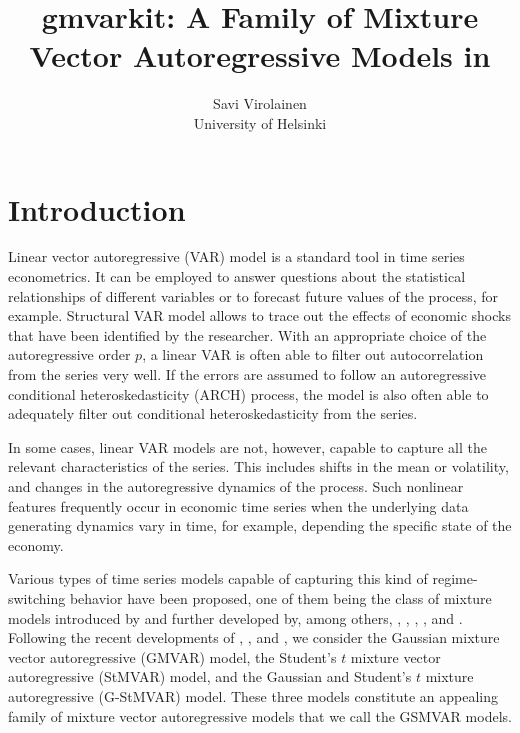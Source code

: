 \documentclass[nojss]{jss}
\author{Savi Virolainen\\ University of Helsinki}
\title{gmvarkit: A Family of Mixture Vector Autoregressive Models in \proglang{R}}
\makeatletter
\def\tableofcontents{%
  \section*{\contentsname}%
  \@starttoc{toc}%
}
\makeatother
\begin{document}
\pagebreak
\tableofcontents
\vfill
\pagebreak
{}

\section{Introduction}


Linear vector autoregressive (VAR) model is a standard tool in time series econometrics. It can be employed to answer questions about the statistical relationships of different variables or to forecast future values of the process, for example. Structural VAR model allows to trace out the effects of economic shocks that have been identified by the researcher. With an appropriate choice of the autoregressive order $p$, a linear VAR is often able to filter out autocorrelation from the series very well. If the errors are assumed to follow an autoregressive conditional heteroskedasticity (ARCH) process, the model is also often able to adequately filter out conditional heteroskedasticity from the series.

In some cases, linear VAR models are not, however, capable to capture all the relevant characteristics of the series. This includes shifts in the mean or volatility, and changes in the autoregressive dynamics of the process. Such nonlinear features frequently occur in economic time series when the underlying data generating dynamics vary in time, for example, depending the specific state of the economy.

Various types of time series models capable of capturing this kind of regime-switching behavior have been proposed, one of them being the class of mixture models introduced by \cite{Le+Martin+Raftery:1996} and further developed by, among others, \cite{Kalliovirta+Meitz+Saikkonen:2015}, \cite{Kalliovirta+Meitz+Saikkonen:2015}, \cite{Meitz+Preve+Saikkonen:2021}, \cite{Virolainen:2024}, and \cite{Virolainen:2021, Virolainen2:2021}. Following the recent developments of \cite{Kalliovirta+Meitz+Saikkonen:2016}, \cite{Virolainen:2024}, and \cite{Virolainen2:2021}, we consider the Gaussian mixture vector autoregressive (GMVAR) model, the Student's $t$ mixture vector autoregressive (StMVAR) model, and the Gaussian and Student's $t$ mixture autoregressive (G-StMVAR) model. These three models constitute an appealing family of mixture vector autoregressive models that we call the GSMVAR models.
\end{document}
